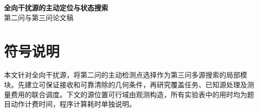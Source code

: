 \begin{center}
{\LARGE\bfseries 全向干扰源的主动定位与状态搜索}\\[7pt]
{\large 第二问与第三问论文稿}
\end{center}
\vspace{4pt}
\section{符号说明}\label{ux7b26ux53f7ux8bf4ux660e}

本文针对全向干扰源，将第二问的主动检测点选择作为第三问多源搜索的局部模块。先建立可保证接收和可靠清除的几何条件，再研究覆盖任务、已知源处理及测量费用的联合调度。下文的源位置可行域由观测构造，所有实验表中的用时均为题目动作计费时间，程序计算耗时单独说明。

